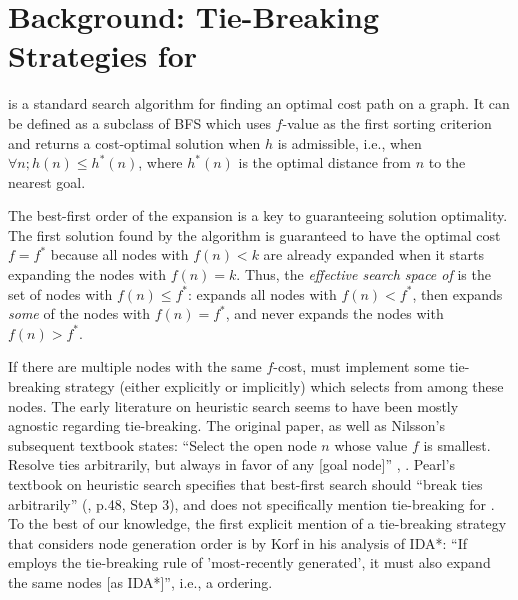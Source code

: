 \section{Background: Tie-Breaking Strategies for \astar}

\label{sec:astar-background}

\astar is a standard search algorithm for finding an optimal cost path
on a graph.
It can be defined as a subclass of BFS which uses $f$-value as the first sorting criterion
and returns a cost-optimal solution when $h$ is admissible, i.e., when
$\forall n; h(n) \leq h^*(n)$, where $h^*(n)$ is the optimal distance from $n$ to
the nearest goal.

The best-first order of the expansion is a key to guaranteeing solution optimality. 
The first solution found by the algorithm is guaranteed to have the optimal cost $f=f^*$ because 
all nodes with $f(n) < k$ are already expanded when it starts expanding
the nodes with $f(n) = k$.
Thus, the \emph{effective search space of \astar} is the set of nodes with 
$f(n) \leq f^*$: \astar expands all nodes with $f(n) < f^*$, then
expands \emph{some} of the nodes with $f(n) = f^*$, and
never expands the nodes with $f(n) > f^*$.

If there are multiple nodes with the same $f$-cost, \astar
must implement some tie-breaking strategy (either
explicitly or implicitly) which selects from among these nodes.
The early literature on heuristic search seems to have been mostly agnostic regarding tie-breaking.
The original \astar paper, as well as Nilsson's subsequent textbook 
states: ``Select the open node $n$ whose value $f$
is smallest. Resolve ties arbitrarily, but always in favor of any [goal
node]'' \cite[p.102 Step 2]{hart1968formal}, \cite[p.69]{Nilsson71}.
Pearl's textbook on heuristic search specifies that best-first search should ``break ties arbitrarily'' (\citeyear{pearl1984heuristics}, p.48, Step 3), and does not specifically mention tie-breaking for \astar.
To the best of our knowledge, the first explicit mention of a tie-breaking strategy that considers node generation order is by Korf in his analysis of IDA*: ``If \astar employs the tie-breaking rule of 'most-recently generated', it must also expand the same nodes [as IDA*]'', i.e., a \lifo ordering.

